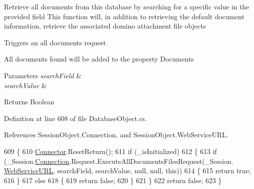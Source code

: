Retrieve all documents from this database by searching for a specific value in the provided field This function will, in addition to retrieving the default document information, retrieve the associated domino attachment file objects 

Triggers an all documents request

All documents found will be added to the property \textquotesingle{}Documents\textquotesingle{}


\begin{DoxyParams}{Parameters}
{\em search\+Field} & \\
\hline
{\em search\+Value} & \\
\hline
\end{DoxyParams}
\begin{DoxyReturn}{Returns}
Boolean
\end{DoxyReturn}


Definition at line 608 of file Database\+Object.\+cs.



References Session\+Object.\+Connection, and Session\+Object.\+Web\+Service\+U\+RL.


\begin{DoxyCode}
609     \{
610         \mbox{\hyperlink{class_connector}{Connector}}.ResetReturn();
611         \textcolor{keywordflow}{if} (\_isInitialized)
612         \{
613             \textcolor{keywordflow}{if} (\_Session.\mbox{\hyperlink{class_session_object_a014bdbf705a753540e19bfb53030c55c}{Connection}}.Request.ExecuteAllDocumentsFilesRequest(\_Session.
      \mbox{\hyperlink{class_session_object_a697c071c812fbf7ad1166b896fb44c16}{WebServiceURL}}, searchField, searchValue, null, null, \textcolor{keyword}{this}))
614             \{
615                 \textcolor{keywordflow}{return} \textcolor{keyword}{true};
616             \}
617             \textcolor{keywordflow}{else}
618             \{
619                 \textcolor{keywordflow}{return} \textcolor{keyword}{false};
620             \}
621         \}
622         \textcolor{keywordflow}{return} \textcolor{keyword}{false};
623     \}
\end{DoxyCode}
\mbox{\label{class_database_object_a9332713c924ab14195fe51bf0b8d35d1}} 
